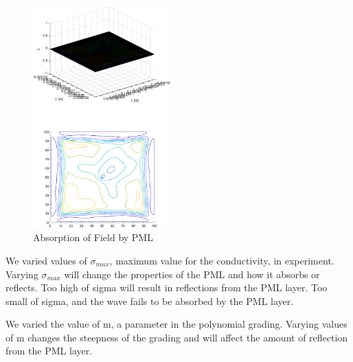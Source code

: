 \documentclass{article}
\begin{document}
\begin{figure}
  \centering
  \includegraphics[width=200]{GaussianReflection}
  \caption{Absorption of Field by PML}\label{fig:GaussianReflection}
\end{figure}

We varied values of $\sigma_{max}$, maximum value for the conductivity, in
experiment. Varying $\sigma_{max}$ will change the properties of the PML and how
it absorbs or reflects. Too high of sigma will result in reflections from the
PML layer. Too small of sigma, and the wave fails to be absorbed by the PML layer.

We varied the value of m, a parameter in the polynomial grading. Varying values
of m changes the steepness of the grading and will affect the amount of
reflection from the PML layer. 
\end{document}
